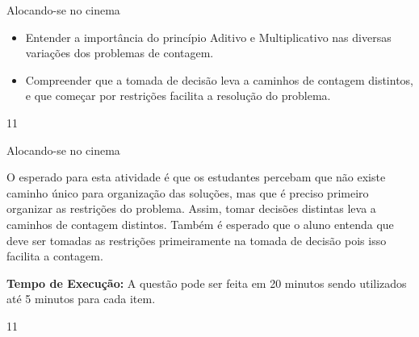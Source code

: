 \begin{objectives}{Alocando-se no cinema}
{
\begin{itemize}
\item Entender a importância do princípio Aditivo e Multiplicativo nas diversas variações dos problemas de contagem. 
\item Compreender que a tomada de decisão leva a caminhos de contagem distintos, e que começar por restrições facilita a resolução do problema. 
\end{itemize}
}{1}{1}
\end{objectives}
\mspace{-2.25em}
\begin{sugestions}{Alocando-se no cinema}
{
O esperado para esta atividade é que os estudantes percebam que não existe caminho único para organização das soluções, mas que é preciso primeiro organizar as restrições do problema. Assim, tomar decisões distintas leva a  caminhos de contagem distintos. Também é esperado que o aluno entenda que deve ser tomadas as restrições primeiramente na tomada de decisão pois isso facilita a contagem.

\textbf{Tempo de Execução:} A questão pode ser feita em 20 minutos sendo utilizados até 5 minutos para cada item. 
}{1}{1}
\end{sugestions}
